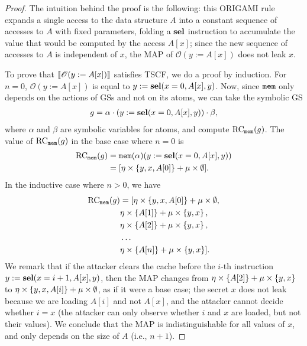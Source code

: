 \begin{proof}
    The intuition behind the proof is the following: this ORIGAMI rule expands a single access to the data structure $A$ into a constant sequence of accesses to $A$ with fixed parameters, folding a $\textbf{sel}$ instruction to accumulate the value that would be computed by the access $A[x]$; since the new sequence of accesses to $A$ is independent of $x$, the MAP of $\mathscr{O}(y:=A[x])$ does not leak $x$. 

    To prove that $\llbracket \mathscr{O}(y:=A[x])\rrbracket$ satisfies TSCF, we do a proof by induction.
    For $n=0$, $\mathscr{O}(y:=A[x])$ is equal to $y:=\textbf{sel}(x=0,A[x],y)$. Now, since $\texttt{mem}$ only depends on the actions of GSs and not on its atoms, we can take the symbolic GS 
    \begin{align*}
        g=\alpha\cdot (y:=\textbf{sel}(x=0,A[x],y))\cdot \beta,
    \end{align*}where $\alpha$ and $\beta$  are symbolic variables for atoms, and compute $\text{RC}_{\texttt{mem}}(g)$. %
    The value of $\text{RC}_{\texttt{mem}}(g)$ in the base case where $n=0$ is
    \begin{align*}
        \RC_{\cache}(g)%
        &=\cache(\alpha)(y:=\sel(x=0,A[x],y))\\%
        &=[\eta\times\set{y,x,A[0]}+\mu\times \emptyset].%
    \end{align*}
In the inductive case where $n>0$, we have
    \begin{align*}
        \text{RC}_{\texttt{mem}}(g)&=[\eta\times\left\{y,x,A[0]\right\}+\mu\times \emptyset,\\
        &\eta\times\left\{A[1]\right\}+\mu\times \left\{y,x\right\},\\
        &\eta\times\left\{A[2]\right\}+\mu\times \left\{y,x\right\},\\
        &\ldots\\
        &\eta\times\left\{A[n]\right\}+\mu\times \left\{y,x\right\}].
    \end{align*}
We remark that if the attacker clears the cache before the $i$-th instruction $y:=\textbf{sel}(x=i+1,A[x],y)$, then the MAP changes from $\eta\times\left\{A[2]\right\}+\mu\times \left\{y,x\right\}$ to $\eta\times\left\{y,x,A[i]\right\}+\mu\times \emptyset$, as if it were a base case; the secret $x$ does not leak because we are loading $A[i]$ and not $A[x]$, and the attacker cannot decide whether $i=x$ (the attacker can only observe whether $i$ and $x$ are loaded, but not their values). We conclude that the MAP is indistinguishable for all values of $x$, and only depends on the size of $A$ (i.e., $n+1$). 

\end{proof}
